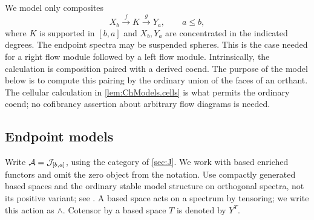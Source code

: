 We model only composites
\[
    X_b \xrightarrow{f} K \xrightarrow{g} Y_a,
    \qquad a\leq b,
\]
where $K$ is supported in $[b,a]$ and $X_b,Y_a$ are concentrated in the indicated degrees. The endpoint spectra may be suspended spheres. This is the case needed for a right flow module followed by a left flow module. Intrinsically, the calculation is composition paired with a derived coend. The purpose of the model below is to compute this pairing by the ordinary union of the faces of an orthant. The cellular calculation in \cref{lem:ChModels.cells} is what permits the ordinary coend; no cofibrancy assertion about arbitrary flow diagrams is needed.

\subsection{Endpoint models}\label{sec:ChModels.endpoints}

Write $\mathcal{A}=\mathcal{J}_{[b,a]}$, using the category of \cref{sec:J}. We work with based enriched functors and omit the zero object from the notation. Use compactly generated based spaces and the ordinary stable model structure on orthogonal spectra, not its positive variant; see \cite[Theorem~9.2]{MMSS01}. A based space acts on a spectrum by tensoring; we write this action as $\wedge$. Cotensor by a based space $T$ is denoted by $Y^T$.

